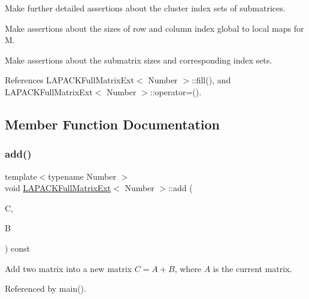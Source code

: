 Make further detailed assertions about the cluster index sets of submatrices.

Make assertions about the sizes of row and column index global to local maps for {\ttfamily M}.

Make assertions about the submatrix sizes and corresponding index sets.

References L\+A\+P\+A\+C\+K\+Full\+Matrix\+Ext$<$ Number $>$\+::fill(), and L\+A\+P\+A\+C\+K\+Full\+Matrix\+Ext$<$ Number $>$\+::operator=().



\subsection{Member Function Documentation}
\mbox{\label{classLAPACKFullMatrixExt_a824a7a919666c8af3df5723175f6201e}} 
\subsubsection{\texorpdfstring{add()}{add()}\hspace{0.1cm}{\footnotesize\ttfamily [1/4]}}
{\footnotesize\ttfamily template$<$typename Number $>$ \\
void \hyperlink{classLAPACKFullMatrixExt}{L\+A\+P\+A\+C\+K\+Full\+Matrix\+Ext}$<$ Number $>$\+::add (\begin{DoxyParamCaption}\item[{\hyperlink{classLAPACKFullMatrixExt}{L\+A\+P\+A\+C\+K\+Full\+Matrix\+Ext}$<$ Number $>$ \&}]{C,  }\item[{const \hyperlink{classLAPACKFullMatrixExt}{L\+A\+P\+A\+C\+K\+Full\+Matrix\+Ext}$<$ Number $>$ \&}]{B }\end{DoxyParamCaption}) const}

Add two matrix into a new matrix $C = A + B$, where $A$ is the current matrix. 

Referenced by main().

\mbox{\label{classLAPACKFullMatrixExt_a793c6b5e30522c2ae653df0e80ed6ab3}} 
